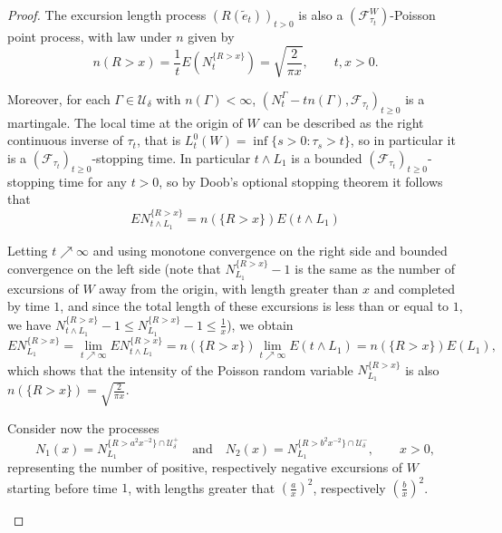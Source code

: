 \documentclass[reqno]{amsart}
\theoremstyle{definition}
\theoremstyle{remark}
\numberwithin{equation}{section}
\begin{document}
\begin{proof}
The excursion length process $(R(\widetilde{e}_t))_{t>0}$ is also a $(\mathcal{F}_{\tau_t}^W)$-Poisson point process, with law under $n$ given by
\begin{equation}
n(R>x)=\frac1t E(N_t^{\{R>x\}})=\sqrt{\frac{2}{\pi x}}, \qquad t,x>0.
\end{equation}

Moreover, for each $\Gamma \in \mathcal{U}_\delta$ with $n(\Gamma)<\infty$, $\left(N_t^\Gamma-tn(\Gamma),\mathcal{F}_{\tau_t}\right)_{t\ge0}$ is a martingale. The local time at the origin of $W$ can be described as the right continuous inverse of $\tau_t$, that is $L_t^0(W)=\inf\{s>0:\tau_s>t\}$, so in particular it is a $(\mathcal{F}_{\tau_t})_{t\ge0}$-stopping time. In particular $t\wedge L_1$ is a bounded $(\mathcal{F}_{\tau_t})_{t\ge0}$-stopping time for any $t>0$, so by Doob's optional stopping theorem it follows that $$EN_{t\wedge L_1}^{\{R>x\}} =n(\{ R > x \}) E\left(t\wedge L_1\right)$$

Letting $t\nearrow \infty$ and using monotone convergence on the right side and bounded convergence on the left side (note that $N_{L_1}^{\{R>x\}}-1$ is the same as the number of excursions of $W$ away from the origin, with length greater than $x$ and completed by time $1$, and since the total length of these excursions is less than or equal to $1$, we have $N_{t\wedge L_1}^{\{R>x\}}-1 \le N_{L_1}^{\{R>x\}} -1\le \frac{1}{x}$), we obtain
\begin{equation*}
E N_{L_1}^{\{R>x\}}=\lim_{t\nearrow \infty} E N_{t \wedge L_1}^{\{R>x\}} = n(\{ R > x \})\lim_{t \nearrow \infty}  E\left(t\wedge L_1\right) = n(\{ R > x \}) E\left(L_1\right),
\end{equation*}
which shows that the intensity of the Poisson random variable  $N_{L_1}^{\{R>x\}}$ is also $n(\{R>x\})=\sqrt{\frac{2}{\pi x}}$.

Consider now the processes
\begin{equation}
N_1(x)=N_{L_1}^{\{R>a^2x^{-2}\}\cap \mathcal{U}_\delta^+} \quad\text{and}\quad N_2(x)=N_{L_1}^{\{R>b^2x^{-2}\}\cap \mathcal{U}_\delta^-}, \qquad x>0,
 \end{equation}
representing the number of positive, respectively negative excursions of $W$ starting before time $1$, with lengths greater that $(\frac{a}{x})^2$, respectively $(\frac{b}{x})^2$.

\label{N_1 and N_2}


\end{proof}
\end{document}
